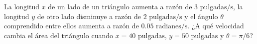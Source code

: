 \item La longitud $x$ de un lado de un triángulo aumenta a razón de $3\text{ pulgadas/s}$, la longitud $y$ de otro lado disminuye a razón de $2\text{ pulgadas/s}$ y el ángulo $\theta$ comprendido entre ellos aumenta a razón de $0.05\text{ radianes/s}$. ¿A qué velocidad cambia el área del triángulo cuando $x = 40\text{ pulgadas}$, $y = 50\text{ pulgadas}$ y $\theta = \pi/6$?
